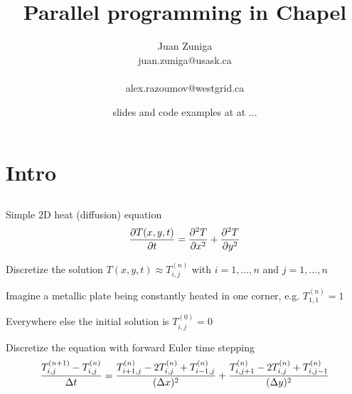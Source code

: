 \documentclass[xcolor=svgnames,aspectratio=169]{beamer}
\begin{document}
\title[VisIt Workshop]{\LARGE Parallel programming in Chapel}
\author[]{{\large\sc Juan Zuniga}\\{\small juan.zuniga@usask.ca}\\\\{\small alex.razoumov@westgrid.ca}}
\date[May 2017]{\textcolor{byzantium}{\footnotesize slides and code examples at at ...}}

\begin{frame}
  \titlepage
\end{frame}

\section{Intro}
\subsection{} %

\newcommand{\tnij}{\ensuremath{T^{(n)}_{i,j}}}

\begin{frame}{}
  \begin{itemize}\setlength{\itemsep}{3mm}
    \item Simple 2D heat (diffusion) equation
    \[
      {\partial T(x,y,t)\over\partial t}={\partial^2 T\over\partial x^2}+{\partial^2 T\over\partial y^2}
    \]
    {\footnotesize
      \item Discretize the solution $T(x,y,t)\approx T^{(n)}_{i,j}$ with $i=1,...,n$ and $j=1,...,n$
      \item Imagine a metallic plate being constantly heated in one corner, e.g. $T^{(n)}_{1,1}=1$
      \item Everywhere else the initial solution is $T^{(0)}_{i,j}=0$}
    \item Discretize the equation with forward Euler time stepping
    \[
      {T^{(n+1)}_{i,j}-\tnij\over\Delta t}=
      {T^{(n)}_{i+1,j}-2T^{(n)}_{i,j}+T^{(n)}_{i-1,j}\over(\Delta x)^2}+
      {T^{(n)}_{i,j+1}-2T^{(n)}_{i,j}+T^{(n)}_{i,j-1}\over(\Delta y)^2}
    \]
  \end{itemize}
\end{frame}
\end{document}
